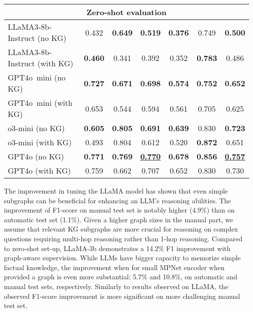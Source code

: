 \begin{table*}[ht!]
{\begin{tabular}{lcccccc}
        \midrule
        \multicolumn{7}{c}{\textbf{Zero-shot evaluation}} \\ \midrule
        
        LLaMA3-8b-Instruct (no KG)                  & 0.432 & \textbf{0.649} & \textbf{0.519} & \textbf{0.376} & 0.749 & \textbf{0.500} \\
        LLaMA3-8b-Instruct (with KG)             & \textbf{0.460} & 0.341 & 0.392 & 0.352 & \textbf{0.783} & 0.486 \\ \hline
        
        GPT4o~mini (no KG)        & \textbf{0.727} & \textbf{0.671} & \textbf{0.698} & \textbf{0.574} & \textbf{0.752} & \textbf{0.652}  \\
        GPT4o~mini (with KG) & 0.653 & 0.544 & 0.594 & 0.561 & 0.705 & 0.625 \\ \hline
        
        
        
        o3-mini (no KG)        & \textbf{0.605} & \textbf{0.805} & \textbf{0.691} & \textbf{0.639} & 0.830 & \textbf{0.723} \\
        o3-mini (with KG)      & 0.493 & 0.804 & 0.612 & 0.520 & \textbf{0.872} & 0.651 \\ \hline
        
        GPT4o (no KG)              & \textbf{0.771} & \textbf{0.769} & \textbf{\underline{0.770}} & \textbf{0.678} & \textbf{0.856} & \textbf{\underline{0.757}} \\
        GPT4o (with KG)      & 0.759 & 0.662 & 0.707 & 0.652 & 0.830 & 0.730 \\ %
        \bottomrule
    \end{tabular}
    }
\end{table*}

The improvement in tuning the LLaMA model has shown that even simple subgraphs can be beneficial for enhancing an LLM's reasoning abilities. The improvement of F1-score on manual test set is notably higher (4.9\%) than on automatic test set (1.1\%). Given a higher graph sizes in the manual part, we assume that relevant KG subgraphs are more crucial for reasoning on complex questions requiring multi-hop reasoning rather than 1-hop reasoning. Compared to zero-shot set-up, LLaMA-3b demonstrates a 14.2\% F1 improvement with graph-aware supervision. While LLMs have bigger capacity to memorize simple factual knowledge, the improvement when for small MPNet encoder when provided a graph is even more substantial: 5.7\% and 10.8\%, on automatic and manual test sets, respectively. Similarly to results observed on LLaMA, the observed F1-score improvement is more significant on more challenging manual test set.

